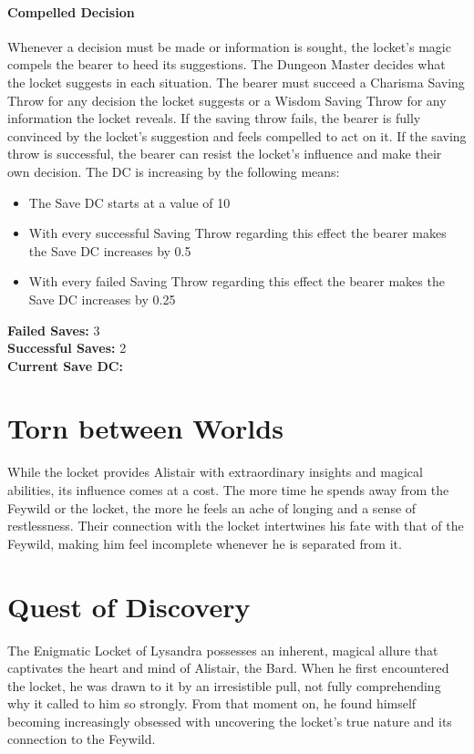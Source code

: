 \documentclass[letterpaper,openany,oneside,twocolumn]{book}
\begin{document}
\paragraph{Compelled Decision}
Whenever a decision must be made or information is sought, the locket's magic compels the bearer to heed its suggestions. The Dungeon Master decides what the locket suggests in each situation. The bearer must succeed a Charisma Saving Throw for any decision the locket suggests or a Wisdom Saving Throw for any information the locket reveals. If the saving throw fails, the bearer is fully convinced by the locket's suggestion and feels compelled to act on it. If the saving throw is successful, the bearer can resist the locket's influence and make their own decision. The DC is increasing by the following means:
\begin{itemize}
	\item The Save DC starts at a value of 10
	\item With every successful Saving Throw regarding this effect the bearer makes the Save DC increases by \xdef\successIncrease{0.5}\successIncrease
	\item With every failed Saving Throw regarding this effect the bearer makes the Save DC increases by \xdef\failIncrease{0.25}\failIncrease
\end{itemize}
\textbf{Failed Saves:} \xdef\failedSaves{3}\failedSaves\\
\textbf{Successful Saves:} \xdef\successSaves{2}\successSaves\\
\textbf{Current Save DC: \FPeval{saveDC}{clip(10+\failedSaves*failIncrease+\successSaves*\successIncrease)}\saveDC}
\section*{Torn between Worlds}
While the locket provides Alistair with extraordinary insights and magical abilities, its influence comes at a cost. The more time he spends away from the Feywild or the locket, the more he feels an ache of longing and a sense of restlessness. Their connection with the locket intertwines his fate with that of the Feywild, making him feel incomplete whenever he is separated from it.
\section*{Quest of Discovery}
The Enigmatic Locket of Lysandra possesses an inherent, magical allure that captivates the heart and mind of Alistair, the Bard. When he first encountered the locket, he was drawn to it by an irresistible pull, not fully comprehending why it called to him so strongly. From that moment on, he found himself becoming increasingly obsessed with uncovering the locket's true nature and its connection to the Feywild.
\end{document}
